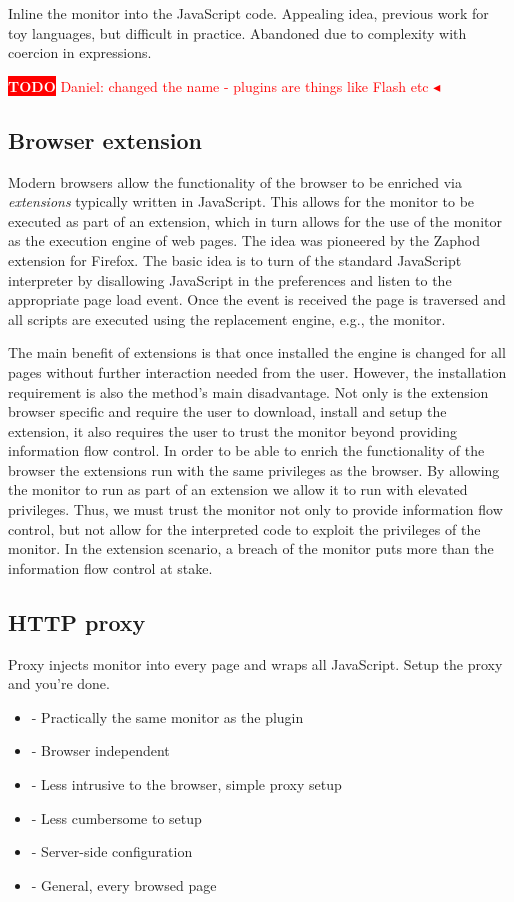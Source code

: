 \documentclass{llncs}
\newcommand{\todo}[1]{\colorbox{red}{\textcolor{white}{\sffamily\bfseries\scriptsize TODO}} \textcolor{red}{#1} \textcolor{red}{$\blacktriangleleft$}}
\begin{document}
Inline the monitor into the JavaScript code. Appealing idea, previous work for 
toy languages, but difficult in practice. Abandoned due to complexity with 
coercion in expressions.


\todo{Daniel: changed the name - plugins are things like Flash etc}
\subsection{Browser extension}
%
Modern browsers allow the functionality of the browser to be enriched via
\emph{extensions} typically written in JavaScript. This allows for the monitor
to be executed as part of an extension, which in turn allows for the use of the
monitor as the execution engine of web pages. The idea was pioneered by the
Zaphod\cite{Zaphod} extension for Firefox.  The basic idea is to turn of the
standard JavaScript interpreter by disallowing JavaScript in the preferences
and listen to the appropriate page load event. Once the event is received the
page is traversed and all scripts are executed using the replacement engine,
e.g., the monitor. 

The main benefit of extensions is that once installed the engine is changed for
all pages without further interaction needed from the user. However, the
installation requirement is also the method's main disadvantage. Not only is
the extension browser specific and require the user to download, install and
setup the extension, it also requires the user to trust the monitor beyond
providing information flow control. In order to be able to enrich the
functionality of the browser the extensions run with the same privileges as the
browser. By allowing the monitor to run as part of an extension we allow it to
run with elevated privileges. Thus, we must trust the monitor not only to
provide information flow control, but not allow for the interpreted code to
exploit the privileges of the monitor. In the extension scenario, a breach of
the monitor puts more than the information flow control at stake.


\subsection{HTTP proxy}

Proxy injects monitor into every page and wraps all JavaScript. Setup the proxy 
and you're done.
\begin{itemize}
\item- Practically the same monitor as the plugin
\item- Browser independent
\item- Less intrusive to the browser, simple proxy setup
\item- Less cumbersome to setup
\item- Server-side configuration
\item- General, every browsed page
\end{itemize}
\end{document}
